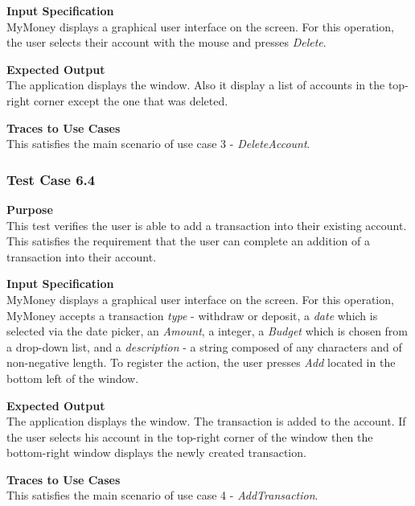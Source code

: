 \documentclass[12pt]{article}
\begin{document}
 \noindent
 {\bf Input Specification}\\
 MyMoney displays a graphical user interface on the screen.
 For this operation, the user selects their account with the mouse and presses \textit{Delete}.
                            
 \noindent
 {\bf Expected Output}\\
 The application displays the window.
 Also it display a list of accounts in the top-right corner except the one that was deleted.

\noindent
{\bf Traces to Use Cases}\\
This satisfies the main scenario of use case 3 - \textit{DeleteAccount}.


\subsubsection{Test Case 6.4} \label{6.4}

\noindent
{\bf Purpose}\\
This test verifies the user is able to add a transaction into their existing account.
This satisfies the requirement that the user can complete an addition of a transaction into their account.
                                        
\noindent
{\bf Input Specification}\\
MyMoney displays a graphical user interface on the screen.
For this operation, MyMoney accepts a transaction \textit{type} - withdraw or deposit, a \textit{date}
which is selected via the date picker, an \textit{Amount}, a integer, a \textit{Budget} which is chosen
from a drop-down list, and a \textit{description} - a string composed of any characters and
of non-negative length. To register the action, the user presses \textit{Add} located in the bottom left
of the window.                                          

\noindent
{\bf Expected Output}\\
The application displays the window.    
The transaction is added to the account.
If the user selects his account in the top-right corner of the window then
the bottom-right window displays the newly created transaction.
                                                
\noindent
{\bf Traces to Use Cases}\\
This satisfies the main scenario of use case 4 - \textit{AddTransaction}.


\clearpage %
\end{document}

